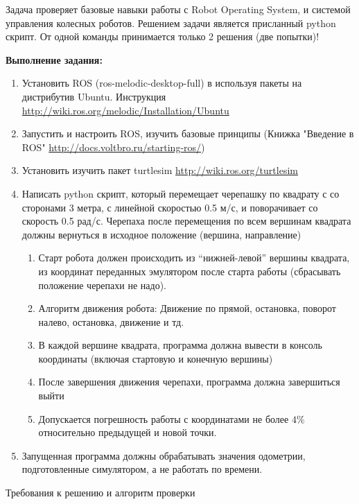 
Задача проверяет базовые навыки работы с Robot Operating System, и системой управления колесных роботов. Решением задачи является присланный python скрипт. От одной команды принимается только 2 решения (две попытки)!

\textbf{Выполнение задания:}

\begin{enumerate}
    \item Установить ROS (ros-melodic-desktop-full) в используя пакеты на дистрибутив Ubuntu. Инструкция \url{http://wiki.ros.org/melodic/Installation/Ubuntu}
    \item Запустить и настроить ROS, изучить базовые принципы (Книжка "Введение в ROS" \url{http://docs.voltbro.ru/starting-ros/})
    \item Установить изучить пакет turtlesim \url{http://wiki.ros.org/turtlesim}
    \item Написать python скрипт, который перемещает черепашку по квадрату с со сторонами 3 метра, с линейной скоростью 0.5 м/с, и поворачивает со скорость 0.5 рад/с. Черепаха после перемещения по всем вершинам квадрата ﻿должны вернуться в исходное положение (вершина, направление)
    \begin{enumerate}
        \item Старт робота должен происходить из “нижней-левой” вершины квадрата, из координат переданных эмулятором после старта работы (сбрасывать положение черепахи не надо).
        \item Алгоритм движения робота: Движение по прямой, остановка, поворот налево, остановка, движение и тд.
        \item В каждой вершине квадрата, программа должна вывести в консоль координаты (включая стартовую и конечную вершины)
        \item После завершения движения черепахи, программа должна завершиться выйти
        \item Допускается погрешность работы с координатами не более $4\%$ относительно предыдущей и новой точки.
    \end{enumerate}
    \item Запущенная программа должны обрабатывать значения одометрии, подготовленные симулятором, а не работать по времени.
\end{enumerate}

Требования к решению и алгоритм проверки

